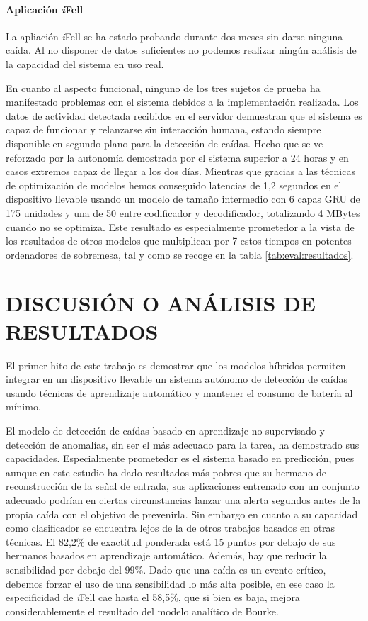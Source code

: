 \documentclass[11pt,a4paper,spanish,twocolumn]{article}
\def\ifell/{\textsl{\textsf{i}}\textsf{Fell}}
\begin{document}
\paragraph{Aplicación \ifell/}

La apliación \ifell/ se ha estado probando durante dos meses sin darse ninguna caída. Al no disponer de datos suficientes no podemos realizar ningún análisis de la capacidad del sistema en uso real. 

En cuanto al aspecto funcional, ninguno de los tres sujetos de prueba ha manifestado problemas con el sistema debidos a la implementación realizada. Los datos de actividad detectada recibidos en el servidor demuestran que el sistema es capaz de funcionar y relanzarse sin interacción humana, estando siempre disponible en segundo plano para la detección de caídas. Hecho que se ve reforzado por la autonomía demostrada por el sistema superior a 24 horas y en casos extremos capaz de llegar a los dos días. Mientras que gracias a las técnicas de optimización de modelos hemos conseguido latencias de 1,2 segundos en el dispositivo llevable usando un modelo de tamaño intermedio con 6 capas GRU de 175 unidades y una de 50 entre codificador y decodificador, totalizando 4 MBytes cuando no se optimiza. Este resultado es especialmente prometedor a la vista de los resultados de otros modelos que multiplican por 7 estos tiempos en potentes ordenadores de sobremesa, tal y como se recoge en la tabla \ref{tab:eval:resultados}. 

\section{DISCUSIÓN O ANÁLISIS DE RESULTADOS}

El primer hito de este trabajo es demostrar que los modelos híbridos permiten integrar en un dispositivo llevable un sistema autónomo de detección de caídas usando técnicas de aprendizaje automático y mantener el consumo de batería al mínimo. 

El modelo de detección de caídas basado en aprendizaje no supervisado y detección de anomalías, sin ser el más adecuado para la tarea, ha demostrado sus capacidades. Especialmente prometedor es el sistema basado en predicción, pues aunque en este estudio ha dado resultados más pobres que su hermano de reconstrucción de la señal de entrada, sus aplicaciones entrenado con un conjunto adecuado podrían en ciertas circunstancias lanzar una alerta segundos antes de la propia caída con el objetivo de prevenirla. 
Sin embargo en cuanto a su capacidad como clasificador se encuentra lejos de la de otros trabajos basados en otras técnicas. El 82,2\% de exactitud ponderada está 15 puntos por debajo de sus hermanos basados en aprendizaje automático. Además, hay que reducir la sensibilidad por debajo del 99\%. Dado que una caída es un evento crítico, debemos forzar el uso de una sensibilidad lo más alta posible, en ese caso la especificidad de \ifell/ cae hasta el 58,5\%, que si bien es baja, mejora considerablemente el resultado del modelo analítico de Bourke. 
\end{document}
